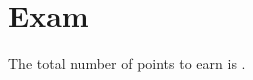 \documentclass[a4paper,answers,addpoints]{exam}
\begin{document}
\section*{Exam}
The total number of points to earn is \numpoints.

\hrulefill


\begin{questions}



\end{questions}
\end{document}
